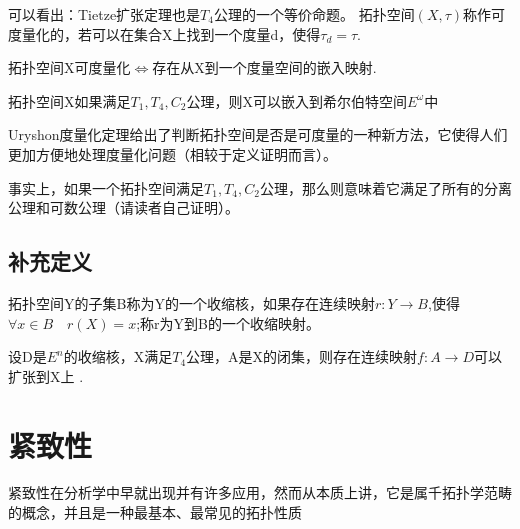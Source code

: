     可以看出：Tietze扩张定理也是\(T_4\)公理的一个等价命题。
    拓扑空间\((X ,\tau )\)称作可度量化的，若可以在集合X上找到一个度量d，使得\(\tau_d = \tau\).
    \begin{corollary}
        拓扑空间X可度量化\(\Leftrightarrow\)存在从X到一个度量空间的嵌入映射.
    \end{corollary}
    \begin{theorem}[Uryshon度量化定理]
        拓扑空间X如果满足\(T_1,T_4,C_2\)公理，则X可以嵌入到希尔伯特空间\(E^{\omega}\)中
    \end{theorem}
    Uryshon度量化定理给出了判断拓扑空间是否是可度量的一种新方法，它使得人们更加方便地处理度量化问题（相较于定义证明而言）。
    \begin{note}
        事实上，如果一个拓扑空间满足\(T_1,T_4,C_2\)公理，那么则意味着它满足了所有的分离公理和可数公理（请读者自己证明）。
    \end{note}
    \subsection*{补充定义}
    \begin{definition}
        拓扑空间Y的子集B称为Y的一个收缩核，如果存在连续映射\(r: Y \rightarrow B\),使得\(\forall x \in B \quad r(X) = x\);称r为Y到B的一个收缩映射。
    \end{definition}
    \begin{theorem}
        设D是\(E^n\)的收缩核，X满足\(T_4\)公理，A是X的闭集，则存在连续映射\(f : A \rightarrow D\)可以扩张到X上 .
    \end{theorem}
    \section{紧致性}
    紧致性在分析学中早就出现并有许多应用，然而从本质上讲，它是属千拓扑学范畴的概念，并且是一种最基本、最常见的拓扑性质
